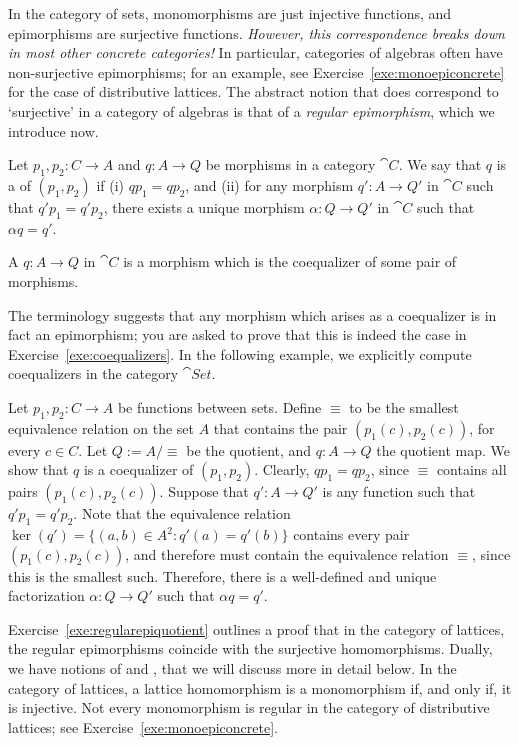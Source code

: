 In the category of sets, monomorphisms are just injective functions, and epimorphisms are surjective functions. \emph{However, this correspondence breaks down in most other concrete categories!} In particular, categories of algebras often have non-surjective epimorphisms; for an example, see Exercise~\ref{exe:monoepiconcrete} for the case of distributive lattices. The abstract notion that does correspond to `surjective' in a category of algebras is that of a \emph{regular epimorphism}, which we introduce now.
\begin{definition}\label{def:coequalizer}
  Let $p_1, p_2 \colon C \to A$ and $q \colon A \to Q$ be morphisms in a category $\cat{C}$. We say that $q$ is a  of $(p_1,p_2)$ if (i) $qp_1 = qp_2$, and (ii) for any morphism $q' \colon A \to Q'$  in $\cat{C}$ such that $q'p_1 = q'p_2$, there exists a unique morphism $\alpha \colon Q \to Q'$ in $\cat{C}$ such that $\alpha q = q'$.

  A  $q \colon A \to Q$ in $\cat{C}$ is a morphism which is the coequalizer of some pair of morphisms.
\end{definition}
The terminology suggests that any morphism which arises as a coequalizer is in fact an epimorphism; you are asked to prove that this is indeed the case in Exercise~\ref{exe:coequalizers}. %
In the following example, we explicitly compute coequalizers in the category $\cat{Set}$.
\begin{example}\label{exa:coequalizer-set}
Let $p_1, p_2 \colon C \to A$ be functions between sets. Define $\equiv$ to be the smallest equivalence relation on the set $A$ that contains the pair $(p_1(c), p_2(c))$, for every $c \in C$. Let $Q := A/{\equiv}$ be the quotient, and $q \colon A \to Q$ the quotient map. We show that $q$ is a coequalizer of $(p_1, p_2)$. Clearly, $qp_1 = qp_2$, since $\equiv$ contains all pairs $(p_1(c),p_2(c))$. Suppose that $q' \colon A \to Q'$ is any function such that $q'p_1 = q'p_2$. Note that the equivalence relation $\ker(q') = \{(a,b) \in A^2 \colon q'(a) = q'(b)\}$ contains every pair $(p_1(c), p_2(c))$, and therefore must contain the equivalence relation $\equiv$, since this is the smallest such. Therefore, there is a well-defined and unique factorization $\alpha \colon Q \to Q'$ such that $\alpha q = q'$.
\end{example}
Exercise~\ref{exe:regularepiquotient} outlines a proof that in the category of
lattices, the regular epimorphisms coincide with the surjective homomorphisms.
Dually, we have notions of  and , that we will discuss more in detail below. In
the category of lattices, a lattice homomorphism is a monomorphism if, and only if, it is
injective.  Not every monomorphism is regular in the category of distributive
lattices; see Exercise~\ref{exe:monoepiconcrete}. 

